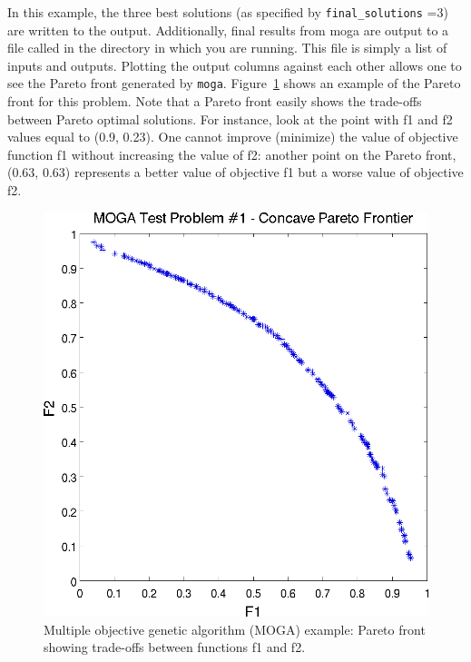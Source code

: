 In this example, the three best solutions (as specified by
\texttt{final\_solutions} =3) are written to the output. Additionally,
final results from moga are output to a file called
 in the directory in which you are
running. This  file is simply a list of inputs
and outputs. Plotting the output columns against each other allows one
to see the Pareto front generated by \texttt{moga}.
Figure~\ref{opt:additional:multiobjective:example2:moga_pareto} shows
an example of the Pareto front for this problem. Note that a Pareto
front easily shows the trade-offs between Pareto optimal solutions. For
instance, look at the point with f1 and f2 values equal to (0.9,
0.23). One cannot improve (minimize) the value of objective function
f1 without increasing the value of f2: another point on the Pareto
front, (0.63, 0.63) represents a better value of objective f1 but a
worse value of objective f2.
\begin{figure}[ht!]
  \centering
  \includegraphics[scale=0.75]{images/dakota_mogatest1_pareto_front}
  \caption{Multiple objective genetic algorithm (MOGA) example: Pareto
  front showing trade-offs between functions f1 and f2.}
  \label{opt:additional:multiobjective:example2:moga_pareto}
\end{figure}



